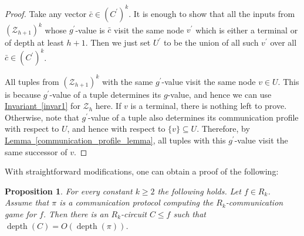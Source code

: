 \documentclass[11pt]{article}
\numberwithin{equation}{section}
\newtheorem{proposition}[theorem]{Proposition}
\theoremstyle{definition}
\theoremstyle{plain}
\newcommand{\expref}[2]{\hyperref[#2]{#1~\ref{#2}}}
\DeclareMathOperator{\depth}{depth}  %
\begin{document}
\begin{proof}
 Take any vector $\bar{c} \in (C^\prime)^k$. It is enough to show that all the inputs from $(\mathcal{Z}_{h + 1})^k$ whose  $g^\prime$-value is $\bar{c}$ visit the same node $v^\prime$ which is either a terminal or of depth at least $h + 1$. Then we just set $U^\prime$ to be the union of all such $v^\prime$ over all $\bar{c} \in (C^\prime)^k$.

  All tuples from $(\mathcal{Z}_{h + 1})^k$ with the same $g^\prime$-value visit the same node $v\in U$. This is because $g^\prime$-value of a tuple determines its $g$-value, and hence we can use \expref{Invariant}{invar1} for $\mathcal{Z}_{h}$ here.  If $v$ is a terminal, there is nothing left to prove. Otherwise, note that $g^\prime$-value of a tuple also determines its communication profile with respect to $U$, and hence with respect to $\{v\} \subseteq U$. Therefore,  by \expref{Lemma}{communication_profile_lemma}, all tuples with this $g^\prime$-value visit the same successor of $v$.
\end{proof}

With straightforward modifications, one can obtain a proof of the following:
\begin{proposition}
\label{R_k_to_circuits}
For every constant $k\ge 2$ the following holds. Let $f\in R_k$. Assume that $\pi$ is a communication protocol computing the $R_k$-communication game for $f$. Then there is an $R_k$-circuit $C \le f$ such that $\depth(C) = O(\depth(\pi))$.
\end{proposition}
\end{document}
